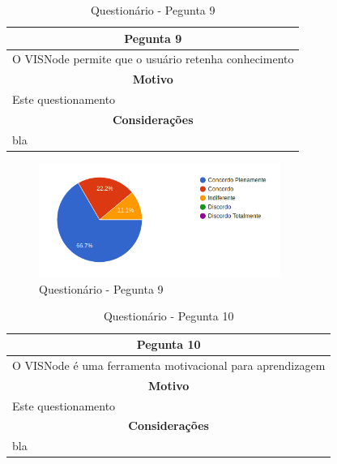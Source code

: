 \documentclass[
	12pt,				%
	oneside,			%
	a4paper,			%
	english,			%
	french,				%
	spanish,			%
	brazil,				%
	]{abntex2}
\begin{document}
\begin{table}[H]
\centering
\caption{Questionário - Pegunta 9} 
\def\arraystretch{1.5}
\begin{tabular}{l}
\hline
\multicolumn{1}{c}{\textbf{Pegunta 9}}              \\ \hline
O VISNode permite que o usuário retenha conhecimento \\ \hline
\multicolumn{1}{c}{\textbf{Motivo}}                 \\ \hline
Este questionamento                                   \\ \hline
\multicolumn{1}{c}{\textbf{Considerações}}          \\ \hline
bla                                                   \\ \hline
\end{tabular}
\sourceAuthor
\end{table}

\begin{figure}[H]
\centering
\caption{Questionário - Pegunta 9}
\includegraphics[width=0.7\textwidth]{imagens/v1/p9.png}
\sourceAuthor
\end{figure}

\begin{table}[H]
\centering
\caption{Questionário - Pegunta 10} 
\def\arraystretch{1.5}
\begin{tabular}{l}
\hline
\multicolumn{1}{c}{\textbf{Pegunta 10}}              \\ \hline
O VISNode é uma ferramenta motivacional para aprendizagem \\ \hline
\multicolumn{1}{c}{\textbf{Motivo}}                 \\ \hline
Este questionamento                                   \\ \hline
\multicolumn{1}{c}{\textbf{Considerações}}          \\ \hline
bla                                                   \\ \hline
\end{tabular}
\sourceAuthor
\end{table}
\end{document}
